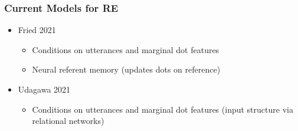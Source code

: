 \documentclass{beamer}
\begin{document}
\begin{frame}
\frametitle{Current Models for RE}
\begin{itemize}
\item Fried 2021
    \begin{itemize}
    \item Conditions on utterances and marginal dot features
    \item Neural referent memory (updates dots on reference)
    \end{itemize}
\item Udagawa 2021
    \begin{itemize}
    \item Conditions on utterances and marginal dot features (input structure via
        relational networks)
    \end{itemize}
\end{itemize}
\end{frame}
\end{document}
